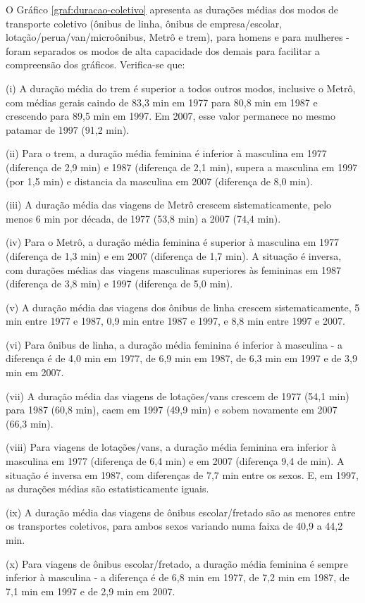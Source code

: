 O Gráfico \ref{graf:duracao-coletivo} apresenta as durações médias dos modos de transporte coletivo (ônibus de linha, ônibus de empresa/escolar, lotação/perua/van/microônibus, Metrô e trem), para homens e para mulheres - foram separados os modos de alta capacidade dos demais para facilitar a compreensão dos gráficos. Verifica-se que:
\begin{compactitem}[]
\item (i) A duração média do trem é superior a todos outros modos, inclusive o Metrô, com médias gerais caindo de 83,3 min em 1977 para 80,8 min em 1987 e crescendo para 89,5 min em 1997. Em 2007, esse valor permanece no mesmo patamar de 1997 (91,2 min).
\item (ii) Para o trem, a duração média feminina é inferior à masculina em 1977 (diferença de 2,9 min) e 1987 (diferença de 2,1 min), supera a masculina em 1997 (por 1,5 min) e distancia da masculina em 2007 (diferença de 8,0 min).
\item (iii) A duração média das viagens de Metrô crescem sistematicamente, pelo menos 6 min por década, de 1977 (53,8 min) a 2007 (74,4 min).
\item (iv) Para o Metrô, a duração média feminina é superior à masculina em 1977 (diferença de 1,3 min) e em 2007 (diferença de 1,7 min). A situação é inversa, com durações médias das viagens masculinas superiores às femininas em 1987 (diferença de 3,8 min) e 1997 (diferença de 5,0 min).
\item (v) A duração média das viagens dos ônibus de linha crescem sistematicamente, 5 min entre 1977 e 1987, 0,9 min entre 1987 e 1997, e 8,8 min entre 1997 e 2007.
\item (vi) Para ônibus de linha, a duração média feminina é inferior à masculina - a diferença é de 4,0 min em 1977, de 6,9 min em 1987, de 6,3 min em 1997 e de 3,9 min em 2007.
\item (vii) A duração média das viagens de lotações/vans crescem de 1977 (54,1 min) para 1987 (60,8 min), caem em 1997 (49,9 min) e sobem novamente em 2007 (66,3 min).
\item (viii) Para viagens de lotações/vans, a duração média feminina era inferior à masculina em 1977 (diferença de 6,4 min) e em 2007 (diferença 9,4 de min). A situação é inversa em 1987, com diferenças de 7,7 min entre os sexos. E, em 1997, as durações médias são estatisticamente iguais.
\item (ix) A duração média das viagens de ônibus escolar/fretado são as menores entre os transportes coletivos, para ambos sexos variando numa faixa de 40,9 a 44,2 min.
\item (x) Para viagens de ônibus escolar/fretado, a duração média feminina é sempre inferior à masculina - a diferença é de 6,8 min em 1977, de 7,2 min em 1987, de 7,1 min em 1997 e de 2,9 min em 2007.
\end{compactitem}

